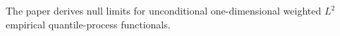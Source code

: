 The paper derives null limits for unconditional one-dimensional weighted \(L^2\) empirical quantile-process functionals.